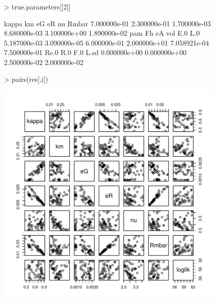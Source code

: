 \documentclass[12pt,reqno,final]{amsart}
\theoremstyle{plain}
\numberwithin{equation}{part}
\begin{document}
\begin{figure}
\begin{Schunk}
\begin{Sinput}
> true.parameters[[2]]
\end{Sinput}
\begin{Soutput}
       kappa           km           eG           eR           nu        Rmbar 
7.000000e-01 2.300000e-01 1.700000e-03 8.680000e-03 3.100000e+00 1.890000e-02 
         pam           Fh           eA          vol          E.0          L.0 
5.187000e-03 3.090000e-05 6.000000e-01 2.000000e+01 7.058921e-04 7.500000e-01 
        Re.0          R.0          F.0         L.sd 
0.000000e+00 0.000000e+00 2.500000e-02 2.000000e-02 
\end{Soutput}
\begin{Sinput}
> pairs(res[,i])
\end{Sinput}
\end{Schunk}
\includegraphics{Correlation_among_parameters-004}
\end{figure}
\end{document}
